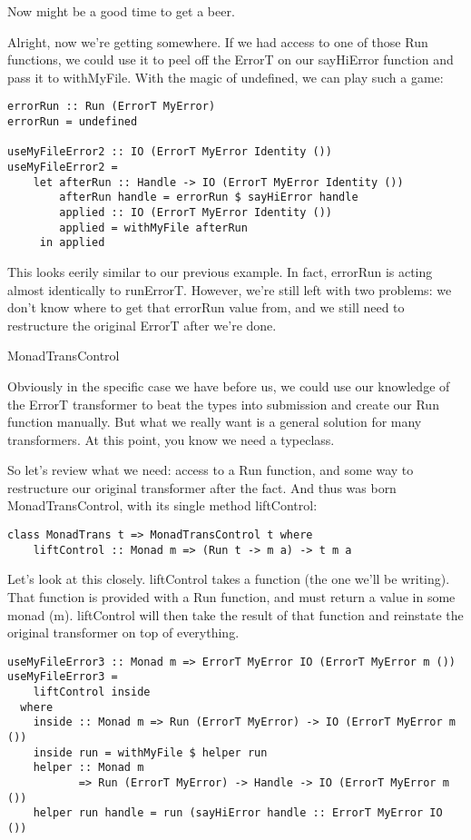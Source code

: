Now might be a good time to get a beer.

Alright, now we're getting somewhere. If we had access to one of those Run functions, we could use it to peel off the ErrorT on our sayHiError function and pass it to withMyFile. With the magic of undefined, we can play such a game:

\begin{lstlisting}
errorRun :: Run (ErrorT MyError)
errorRun = undefined

useMyFileError2 :: IO (ErrorT MyError Identity ())
useMyFileError2 =
    let afterRun :: Handle -> IO (ErrorT MyError Identity ())
        afterRun handle = errorRun $ sayHiError handle
        applied :: IO (ErrorT MyError Identity ())
        applied = withMyFile afterRun
     in applied
\end{lstlisting}

This looks eerily similar to our previous example. In fact, errorRun is acting almost identically to runErrorT. However, we're still left with two problems: we don't know where to get that errorRun value from, and we still need to restructure the original ErrorT after we're done.

MonadTransControl

Obviously in the specific case we have before us, we could use our knowledge of the ErrorT transformer to beat the types into submission and create our Run function manually. But what we really want is a general solution for many transformers. At this point, you know we need a typeclass.

So let's review what we need: access to a Run function, and some way to restructure our original transformer after the fact. And thus was born MonadTransControl, with its single method liftControl:

\begin{lstlisting}
class MonadTrans t => MonadTransControl t where
    liftControl :: Monad m => (Run t -> m a) -> t m a
\end{lstlisting}

Let's look at this closely. liftControl takes a function (the one we'll be writing). That function is provided with a Run function, and must return a value in some monad (m). liftControl will then take the result of that function and reinstate the original transformer on top of everything.

\begin{lstlisting}
useMyFileError3 :: Monad m => ErrorT MyError IO (ErrorT MyError m ())
useMyFileError3 =
    liftControl inside
  where
    inside :: Monad m => Run (ErrorT MyError) -> IO (ErrorT MyError m ())
    inside run = withMyFile $ helper run
    helper :: Monad m
           => Run (ErrorT MyError) -> Handle -> IO (ErrorT MyError m ())
    helper run handle = run (sayHiError handle :: ErrorT MyError IO ())
\end{lstlisting}

